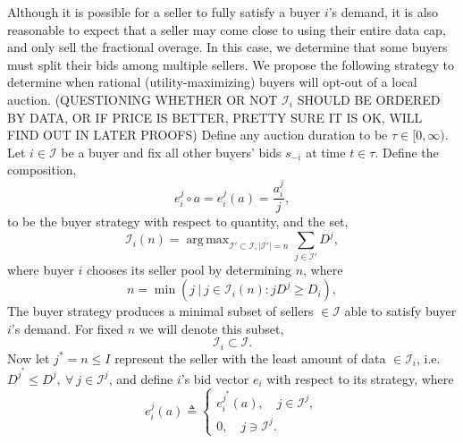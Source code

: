\documentclass[12pt]{article}
\theoremstyle{definition}
\newcommand{\vs}{\varsigma}
\newcommand{\mcI}{\mathcal{I}}
\DeclareMathOperator*{\argmax}{arg\,max}
\DeclareMathOperator*{\argmin}{arg\,min}
\begin{document}
\begin{multicols}{2}
Although it is possible for a seller to fully satisfy a buyer $i$'s demand, it
is also reasonable to expect that a seller may come close to using their
entire data cap, and only sell the fractional overage. In this case, we
determine that some buyers must split their bids among multiple sellers. 
We propose the following strategy to determine when rational
(utility-maximizing) buyers will opt-out of a local auction. (QUESTIONING WHETHER OR NOT $\mcI_i$ SHOULD
BE ORDERED BY DATA, OR IF PRICE IS BETTER, PRETTY SURE IT IS OK, WILL FIND OUT
IN LATER PROOFS)
{
\label{buyerstrategy}
Define any auction duration to be $\tau \in [0,\infty)$. 
Let $i\in\mcI$ be a buyer and fix all other buyers' bids $s_{-i}$ at time
$t\in\tau$. %
Define the composition,
$$
     e_i^j \circ a = e_i^j(a) = \frac{a_i^j}{j},
$$
to be the buyer strategy with respect to quantity, and the set,
$$
    \mcI_i(n) =\argmax_{\mcI' \subset \mcI, \vert\mcI'\vert =
n}\sum_{j\in\mcI'} D^j,
$$
where buyer $i$ chooses its seller pool by determining $n$, where
\begin{equation}\label{buyercoordinate}
    n = \min( j\ \vert\ j\in \mcI_i(n): j D^j\ge D_i),
\end{equation} 
The buyer strategy produces a minimal subset of sellers $\in \mcI$ 
able to satisfy buyer $i$'s demand. For 
fixed $n$ we will denote this subset,
\begin{equation}\label{sellers}
    \mcI_i \subset \mcI.
\end{equation}  
Now let $j^* = n \le I$ represent the seller with the least amount of data
$\in\mcI_i$, i.e. $D^{j^*} \le D^j, \ \forall\ j \in\mcI^j$, and define $i$'s bid
vector $e_i$ with respect to its strategy, where
\begin{equation}\label{opt-minallocation}
    e_i^j(a) \triangleq \begin{cases} e_i^{j^*}(a), \quad j\in\mcI^j,\\
            0, \quad j\ni\mcI^j.\end{cases}
\end{equation}
}
\end{multicols}
\end{document}
